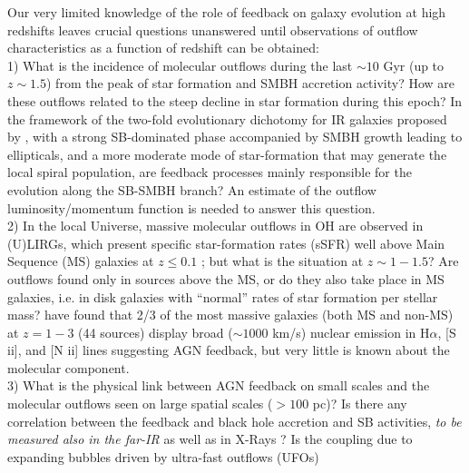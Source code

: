 \documentclass{pasa}%
\begin{document}
Our very limited knowledge of the role of feedback on galaxy evolution at
high redshifts leaves crucial questions unanswered until observations of
outflow characteristics as a function of redshift can be obtained: \\
1) What is the incidence of molecular outflows during the last $\sim10$ Gyr
(up to $z\sim1.5$) from the peak of star formation and SMBH accretion
activity? How are these outflows related to the steep decline in  
star formation during this epoch? In the framework of
the two-fold evolutionary dichotomy for IR galaxies proposed by \cite{gru13},
with a strong SB-dominated phase accompanied by SMBH growth leading to
ellipticals, and a more moderate mode of star-formation that may generate
the local spiral population, are feedback processes mainly responsible for the
evolution along the SB-SMBH branch? An estimate of the outflow
luminosity/momentum function is needed to answer this question. \\ 
2) In the local Universe, massive molecular outflows in OH are observed in
(U)LIRGs, which present specific star-formation rates (sSFR) well above Main
Sequence (MS) galaxies at $z\le0.1$ \citep[e.g.][]{elb07}; but what is the
situation at $z\sim1-1.5$?
Are outflows found only in sources
above the MS, or do they also take place in MS galaxies,
i.e. in disk galaxies with “normal” rates of star formation per stellar mass?
\cite{gen14} have found that 2/3 of the most massive galaxies (both MS and
non-MS) at $z=1-3$ (44 sources) display broad ($\sim1000$ km/s) nuclear
emission in H$\alpha$, [S {\sc ii}], and [N {\sc ii}] lines suggesting 
AGN feedback, but very little is known about the molecular
component. \\
3) What is the physical link between AGN feedback on small scales and
the molecular outflows seen on large spatial scales ($>100$ pc)? Is there any
correlation between the feedback and black hole accretion and SB activities,  
{\em to be measured also in the far-IR} \citep[see][]{spi17,gru17} 
as well as in X-Rays
\citep[{\it Athena} observatory in late 2020s,][]{nan13}? 
Is the coupling due to expanding bubbles driven by ultra-fast outflows (UFOs)
\end{document}
